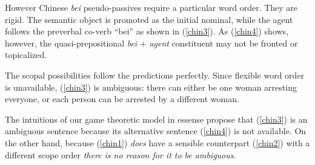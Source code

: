 \documentclass{article}
\begin{document}
\begin{exe}
\ex \begin{xlist}\label{chin}
\end{xlist}
\end{exe}

However Chinese \emph{bei} pseudo-passives require a particular word order.
They are rigid.
The semantic object is promoted as the initial nominal, while the agent follows the preverbal co-verb ``bei'' as shown in (\ref{chin3}). As (\ref{chin4}) shows, however, the quasi-prepositional \emph{bei} $+$ \emph{agent} constituent may not be fronted or topicalized.

\begin{exe}
\end{exe}

The scopal possibilities follow the predictions perfectly. Since flexible word order is unavailable, (\ref{chin3}) is ambiguous: there can either be one woman arresting everyone, or each person can be arrested by a different woman.

The intuitions of our game theoretic model in essense propose that (\ref{chin3}) is an ambiguous sentence because its alternative sentence (\ref{chin4}) is not available.
On the other hand, because (\ref{chin1}) \emph{does} have a sensible counterpart (\ref{chin2}) with a different scope order \emph{there is no reason for it to be ambiguous}.
\end{document}
